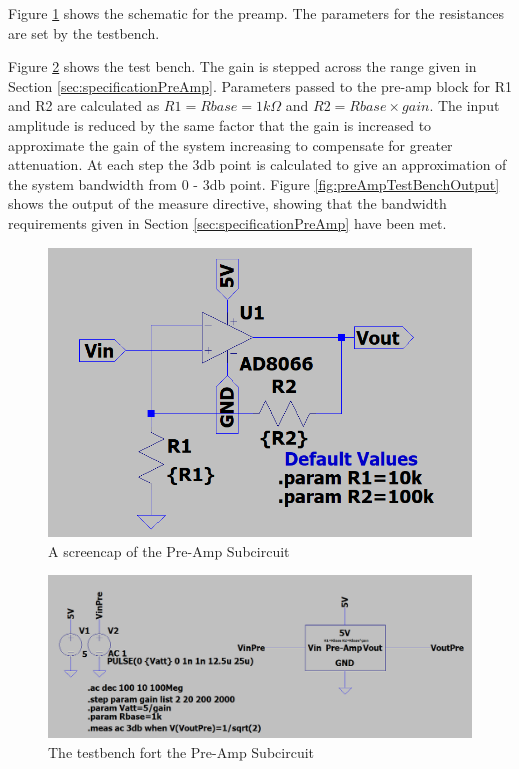Figure \ref{fig:preAmpSchematic} shows the schematic for the preamp.
The parameters for the resistances are set by the testbench.

Figure \ref{fig:preAmpTestBench} shows the test bench. 
The gain is stepped across the range given in Section \ref{sec:specificationPreAmp}.
Parameters passed to the pre-amp block for R1 and R2 are calculated as \(R1 = Rbase = 1k\Omega\) and \(R2 = Rbase \times gain\).
The input amplitude is reduced by the same factor that the gain is increased to approximate the gain of the system increasing to compensate for greater attenuation.
At each step the 3db point is calculated to give an approximation of the system bandwidth from 0 - 3db point. 
Figure \ref{fig:preAmpTestBenchOutput} shows the output of the measure directive, showing that the bandwidth requirements given in Section \ref{sec:specificationPreAmp} have been met.  

\begin{figure}[H]
    \centering 
    \includegraphics[width=\textwidth]{../Circuits/Images/Pre-Amp/Schematic}
    \caption{A screencap of the Pre-Amp Subcircuit}
    \label{fig:preAmpSchematic}
\end{figure}

\begin{figure}[H]
    \centering 
    \includegraphics[width=\textwidth]{../Circuits/Images/Pre-Amp/TestBenchScreencap}
    \caption{The testbench fort the Pre-Amp Subcircuit}
    \label{fig:preAmpTestBench}
\end{figure}

